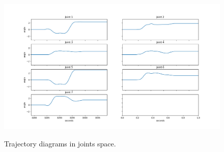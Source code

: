 \begin{center}
\begin{figure}[H]
\centering
\includegraphics[width=\textwidth]{images/trajectory1-test1.png}\\
\caption{Trajectory diagrams in joints space.}
\end{figure}
\end{center}